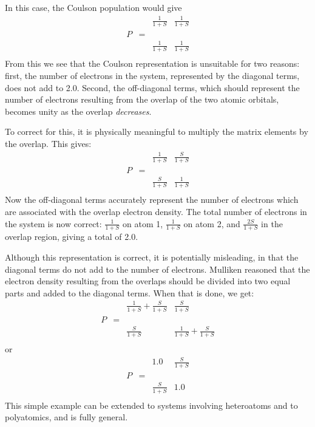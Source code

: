 In this case, the Coulson population would give 
$$
\begin{array}{cc|cc|}
   &   & \frac{1}{1+S} & \frac{1}{1+S} \\
P  & = &               &               \\
   &   & \frac{1}{1+S} & \frac{1}{1+S} \\
\end{array}
$$
From this we see that the Coulson representation is unsuitable for  two
reasons: first, the number of electrons in the system, represented by the
diagonal terms, does not add to 2.0. Second, the off-diagonal terms, which
should represent the  number of electrons resulting from the overlap of the two
atomic orbitals, becomes unity as the overlap {\em decreases}.  

To correct for this, it is physically meaningful to multiply the matrix 
elements by the overlap.  This gives:
$$
\begin{array}{cc|cc|}
   &   & \frac{1}{1+S} & \frac{S}{1+S} \\
P  & = &               &               \\
   &   & \frac{S}{1+S} & \frac{1}{1+S} \\
\end{array}
$$
Now the off-diagonal terms accurately represent the number of electrons which are
associated with the overlap electron density.  The total number of electrons
in the system is now correct: $ \frac{1}{1+S} $ on atom 1, $ \frac{1}{1+S} $
on atom 2, and $ \frac{2S}{1+S} $ in the overlap region, giving a total of 2.0.

Although this representation is correct, it is potentially misleading, in that
the diagonal terms do not add to the number of electrons.  Mulliken reasoned
that the electron density resulting from the overlaps should be divided into
two equal parts and added to the diagonal terms.  When that is done, we get:
$$
\begin{array}{cc|ll|}
   &   & \frac{1}{1+S}+\frac{S}{1+S} & \frac{S}{1+S} \\ 
P  & = &               &               \\ 
   &   & \frac{S}{1+S} & \frac{1}{1+S} +\frac{S}{1+S}\\
\end{array} 
$$
or
$$
\begin{array}{cc|ll|}
   &   & 1.0  & \frac{S}{1+S} \\ 
P  & = &               &               \\ 
   &   &  \frac{S}{1+S} & 1.0\\ 
\end{array} 
$$
This simple example can be extended to systems involving heteroatoms and to
polyatomics, and is fully general.

